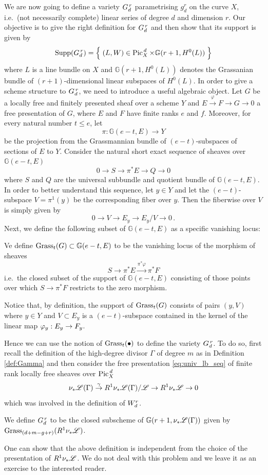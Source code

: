 	We are now going to define a variety $G_d^{\,r}$ parametrising $g_d^r$ on the curve $X$, i.e.\ (not necessarily complete) linear series of degree $d$ and dimension $r$. Our objective is to give the right definition for $G_d^{\,r}$ and then show that its support is given by
	$$ \operatorname{Supp}(G_d^{\,r}) = \left\{\;  (L,W) \in \operatorname{Pic}^{\,d}_X \times \mathbb{G}(r+1, H^0(L))  \; \right\} $$
	where $L$ is a line bundle on $X$ and $\mathbb{G}(r+1, H^0(L))$ denotes the Grassanian bundle of $(r+1)$-dimensional linear subspaces of $H^0(L)$.
	In order to give a scheme structure to $G_d^{\,r}$, we need to introduce a useful algebraic object. Let $G$ be a locally free and finitely presented sheaf over a scheme $Y$ and $ E\overset{\varphi}\to F \to G \to 0$ a free presentation of $G$, where $E$ and $F$ have finite ranks $e$ and $f$. Moreover, for every natural number $t\leq e$, let
	$$ \pi:\mathbb{G}(e-t, E)\to Y $$ 
	be the projection from the Grassmannian bundle of $(e-t)$-subspaces of sections of $E$ to $Y$.
	Consider the natural short exact sequence of sheaves over $\mathbb{G}(e-t, E)$
	$$ 0\to S \to \pi^* E \to Q \to 0 $$
	where $S$ and $Q$ are the universal subbundle and quotient bundle of $\mathbb{G}(e-t, E)$. 
	In order to better understand this sequence, let $y\in Y$ and let the $(e-t)$-subspace $V=\pi^{1}(y)$ be the corresponding fiber over $y$. Then the fiberwise \ses over $V$ is simply given by
	$$ 0\to V \to E_y \to E_y/V \to 0 \,. $$
	Next, we define the following subset of $\mathbb{G}(e-t, E)$ as a specific vanishing locus:
	\begin{defi}
		Ve define $\operatorname{Grass}_t(G) \subset \mathbb{G}(e-t, E)$ to be the vanishing locus of the morphism of sheaves
		$$ S\longrightarrow \pi^*E \overset{\pi^*\varphi} \longrightarrow \pi^* F $$
		i.e.\ the closed subset of the support of $\mathbb{G}(e-t, E)$ consisting of those points over which $S\to \pi^* F$ restricts to the zero morphism.
	\end{defi}
	\begin{rema}\label{rema:ker}
		Notice that, by definition, the support of $\operatorname{Grass}_t(G)$ consists of pairs $(y, V)$ where $y\in Y$ and $V\subset E_y$ is a $(e-t)$-subspace contained in the kernel of the linear map $\varphi_y: E_y \to F_y$.
	\end{rema}
	Hence we can use the notion of $\operatorname{Grass}_t(\bullet)$ to define the variety $G_d^{\,r}$. To do so, first recall the definition of the high-degree divisor $\Gamma$ of degree $m$ as in Definition \ref{def:Gamma} and then consider the free presentation \eqref{eq:univ_lb_seq} of finite rank locally free sheaves over $\operatorname{Pic}^{\,d}_X$
	$$ \nu_{*} \mathscr{L}(\Gamma)\overset{\gamma}\to R^1 \nu_{*} \mathscr{L}(\Gamma) / \mathscr{L} \to R^1 \nu_{*} \mathscr{L} \to 0 $$
	which was involved in the definition of $W_d^r$.
	\begin{defi}
		We define $G_d^{\,r}$ to be the closed subscheme of $\mathbb{G}(r+1, \nu_{*} \mathscr{L}(\Gamma))$ given by $\operatorname{Grass}_{(d+m-g+r)}(R^1 \nu_{*} \mathscr{L})$.
	\end{defi}
	One can show that the above definition is independent from the choice of the presentation of $R^1 \nu_{*} \mathscr{L}$. We do not deal with this problem and we leave it as an exercise to the interested reader.\\


